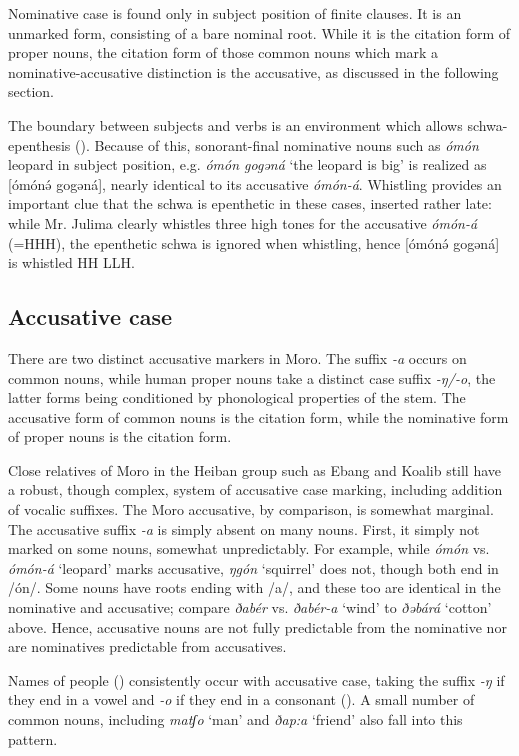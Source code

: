 Nominative case is found only in subject position of finite clauses. It is an unmarked form, consisting of a bare nominal root. While it is the citation form of proper nouns, the citation form of those common nouns which mark a nominative-accusative distinction is the accusative, as discussed in the following section. 

The boundary between subjects and verbs is an environment which allows schwa-epenthesis (). Because of this, sonorant-final nominative nouns such as \textit{ómón} leopard in subject position, e.g. \textit{ómón gogəná} `the leopard is big' is realized as [ómónə́ gogəná], nearly identical to its accusative \textit{ómón-á}. Whistling provides an important clue that the schwa is epenthetic in these cases, inserted rather late: while Mr. Julima clearly whistles three high tones for the accusative \textit{ómón-á} (=HHH), the epenthetic schwa is ignored when whistling, hence [ómónə́  gogəná] is whistled HH LLH. 

\subsection{Accusative case}\label{section:accusative}

There are two distinct accusative markers in Moro. The suffix \textit{-a} occurs on common nouns, while human proper nouns take a distinct case suffix \textit{-ŋ/-o}, the latter forms being conditioned by phonological properties of the stem. The accusative form of common nouns is the citation form, while the nominative form of proper nouns is the citation form.

Close relatives of Moro in the Heiban group such as Ebang and Koalib still have a robust, though complex, system of accusative case marking, including addition of vocalic suffixes. The Moro accusative, by comparison, is somewhat marginal. The accusative suffix \textit{-a} is simply absent on many nouns. First, it simply not marked on some nouns, somewhat unpredictably. For example, while \textit{ómón} vs. \textit{ómón-á} `leopard' marks accusative, \textit{ŋgón} `squirrel' does not, though both end in /ón/. Some nouns have roots ending with /a/, and these too are identical in the nominative and accusative; compare \textit{ðabér} vs. \textit{ðabér-a} `wind' to \textit{ðəbárá} `cotton' above. Hence, accusative nouns are not fully predictable from the nominative nor are nominatives predictable from accusatives.

Names of people () consistently occur with accusative case, taking the suffix \textit{-ŋ} if they end in a vowel and \textit{-o} if they end in a consonant (). A small number of common nouns, including \textit{matʃo} `man' and \textit{ðap:a} `friend' also fall into this pattern.

